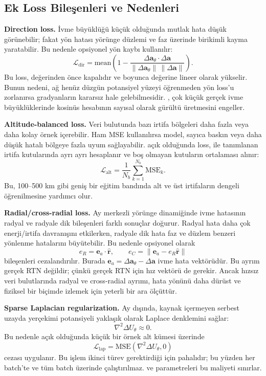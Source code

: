 \subsection{Ek Loss Bileşenleri ve Nedenleri}

\textbf{Direction loss.}
İvme büyüklüğü küçük olduğunda mutlak hata düşük görünebilir; fakat yön hatası yörünge düzlemi ve faz üzerinde birikimli kayma yaratabilir. Bu nedenle opsiyonel yön kaybı kullanılır:
\[
\mathcal{L}_{\mathrm{dir}}
=
\mathrm{mean}\left(1-
\frac{\Delta\mathbf{a}_{\theta}\cdot\Delta\mathbf{a}}
{\|\Delta\mathbf{a}_{\theta}\|\,\|\Delta\mathbf{a}\|}
\right).
\]
Bu loss,  değerinden önce kapalıdır ve  boyunca  değerine lineer olarak yükselir. Bunun nedeni, ağ henüz düzgün potansiyel yüzeyi öğrenmeden yön loss'u zorlanırsa gradyanların kararsız hale gelebilmesidir. , çok küçük gerçek ivme büyüklüklerinde kosinüs hesabının sayısal olarak gürültü üretmesini engeller.

\textbf{Altitude-balanced loss.}
Veri bulutunda bazı irtifa bölgeleri daha fazla veya daha kolay örnek içerebilir. Ham MSE kullanılırsa model, sayıca baskın veya daha düşük hatalı bölgeye fazla uyum sağlayabilir.  açık olduğunda loss,  ile tanımlanan irtifa kutularında ayrı ayrı hesaplanır ve boş olmayan kutuların ortalaması alınır:
\[
\mathcal{L}_{\mathrm{alt}}
=
\frac{1}{N_b}
\sum_{k=1}^{N_b}
\mathrm{MSE}_{k}.
\]
Bu, 100--500 km gibi geniş bir eğitim bandında alt ve üst irtifaların dengeli öğrenilmesine yardımcı olur.

\textbf{Radial/cross-radial loss.}
Ay merkezli yörünge dinamiğinde ivme hatasının radyal ve radyale dik bileşenleri farklı sonuçlar doğurur. Radyal hata daha çok enerji/irtifa davranışını etkilerken, radyale dik hata faz ve düzlem benzeri yönlenme hatalarını büyütebilir. Bu nedenle opsiyonel olarak
\[
e_R = \mathbf{e}_a\cdot\hat{\mathbf{r}},
\qquad
e_C = \|\mathbf{e}_a-e_R\hat{\mathbf{r}}\|
\]
bileşenleri cezalandırılır. Burada \(\mathbf{e}_a=\Delta\mathbf{a}_{\theta}-\Delta\mathbf{a}\) ivme hata vektörüdür. Bu ayrım gerçek RTN değildir; çünkü gerçek RTN için hız vektörü de gerekir. Ancak hızsız veri bulutlarında radyal ve cross-radial ayrımı, hata yönünü daha dürüst ve fiziksel bir biçimde izlemek için yeterli bir ara ölçüttür.

\textbf{Sparse Laplacian regularization.}
Ay dışında, kaynak içermeyen serbest uzayda yerçekimi potansiyeli yaklaşık olarak Laplace denklemini sağlar:
\[
\nabla^2 \Delta U_{\theta} \approx 0.
\]
Bu nedenle  açık olduğunda küçük bir örnek alt kümesi üzerinde
\[
\mathcal{L}_{\mathrm{lap}}
=
\mathrm{MSE}(\nabla^2\Delta U_{\theta},0)
\]
cezası uygulanır. Bu işlem ikinci türev gerektirdiği için pahalıdır; bu yüzden her batch'te ve tüm batch üzerinde çalıştırılmaz.  ve  parametreleri bu maliyeti sınırlar.

